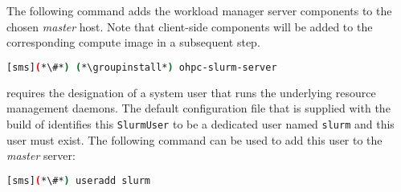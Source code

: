 The following command adds the \SLURM{} workload manager server components to the
chosen {\em master} host. Note that client-side components will be added to
the corresponding compute image in a subsequent step.

\begin{lstlisting}[language=bash,keywords={}]
[sms](*\#*) (*\groupinstall*) ohpc-slurm-server
\end{lstlisting}

\SLURM{} requires the designation of a system user that runs the underlying
resource management daemons. The default configuration file that is supplied
with the \OHPC{} build of \SLURM{} identifies this \texttt{SlurmUser} to be a
dedicated user named \texttt{slurm} and this user must exist. 
The following command can be used to add this user to the {\em
  master} server:

\begin{lstlisting}[language=bash,keywords={}]
[sms](*\#*) useradd slurm
\end{lstlisting}


